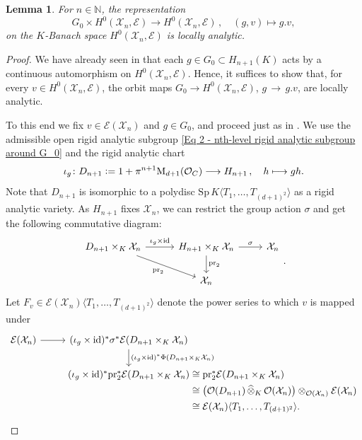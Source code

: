 \documentclass[a4paper, reqno, 10pt]{amsart}
\newtheorem{lemma}[theorem]{Lemma}
\theoremstyle{definition}
\numberwithin{equation}{section}
\newcommand{\cotimes}[1]{{\,\widehat{\otimes}_{#1}\,}}
\newcommand{\defeq}{\vcentcolon=}
\newcommand{\id}{{\mathrm{id}}}
\newcommand{\lra}{\longrightarrow}
\newcommand{\lto}{\longmapsto}
\newcommand{\pr}{{\mathrm{pr}}}
\newcommand{\ra}{\rightarrow}
\newcommand{\Sp}{{\mathrm{Sp}}}
\newcommand{\BN}{{\mathbb {N}}}
\newcommand{\CE}{{\mathcal {E}}}
\newcommand{\CO}{{\mathcal {O}}}
\newcommand{\CX}{{\mathcal {X}}}
\newcommand{\unif}{{\pi}}
\begin{document}
\begin{lemma}\label{Lemma 2 - Sections on X_n are locally analytic representation}
	For $n\in \BN$, the representation
	\[G_0 \times H^0(\CX_n,\CE) \lra H^0(\CX_n,\CE) \,, \quad (g,v) \lto g.v , \]
	on the $K$-Banach space $H^0(\CX_n,\CE)$ is locally analytic.
\end{lemma}
\begin{proof}
	We have already seen in  that each $g\in G_0 \subset H_{n+1}(K)$ acts by a continuous automorphism on $H^0(\CX_n,\CE)$.
	Hence, it suffices to show that, for every $v\in H^0(\CX_n,\CE)$, the orbit maps $G_0 \ra H^0(\CX_n,\CE)$, $g \, \to\, g.v$, are locally analytic.
	
	
	To this end we fix $v \in \CE(\CX_n)$ and $g \in G_0$, and proceed just as in \cite[Prop.\ 2.1']{SchneiderTeitelbaum02pAdicBoundVal}.
	We use the admissible open rigid analytic subgroup \eqref{Eq 2 - nth-level rigid analytic subgroup around G_0} and the rigid analytic chart
	\[\iota_g \colon D_{n+1} \defeq 1+ \unif^{n+1}\mathrm{M}_{d+1}(\CO_C) \lra H_{n+1} \,,\quad h \lto gh .\]
	Note that $D_{n+1}$ is isomorphic to a polydisc $\Sp \, K\langle T_1,\ldots,T_{(d+1)^2} \rangle$ as a rigid analytic variety.
	As $H_{n+1}$ fixes $\CX_n$, we can restrict the group action $\sigma$ and get the following commutative diagram:
	\[\begin{tikzcd}
		D_{n+1} \times_K \CX_n \arrow[r, "\iota_g \times \mathrm{id}"] \arrow[rd, "\pr_2"'] &[+5pt] H_{n+1} \times_K \CX_n \arrow[r, "\sigma"] \arrow[d, "\pr_2"] & \CX_n \\
		&\CX_n&
	\end{tikzcd}.\]
	Let $F_v \in \CE(\CX_n) \langle T_1,\ldots,T_{(d+1)^2} \rangle$ denote the power series to which $v$ is mapped under 
	\begin{equation*}
		\begin{tikzcd}[,/tikz/column 3/.append style={anchor=base west}]
			\CE(\CX_n) \ar[r] & (\iota_g \times \id)^\ast \sigma^\ast \CE(D_{n+1} \times_K \CX_n) \ar[d, "(\iota_g \times \mathrm{id})^{\ast} \Phi (D_{n+1} \times_K \CX_n)"] &[-30pt] \\
			&	(\iota_g \times \id)^\ast \pr_2^\ast \CE(D_{n+1} \times_K \CX_n) &[-30pt] \cong \pr_2^\ast \CE(D_{n+1} \times_K \CX_n) \\[-20pt]
			&&[-30pt] \cong \big( \CO(D_{n+1}) \cotimes{K} \CO(\CX_n) \big) \otimes_{\CO(\CX_n)} \CE(\CX_n) \\[-20pt]
			&&[-30pt] \cong \CE(\CX_n) \langle T_1,\ldots,T_{(d+1)^2} \rangle.

\end{tikzcd}
\end{equation*}
\end{proof}
\end{document}
